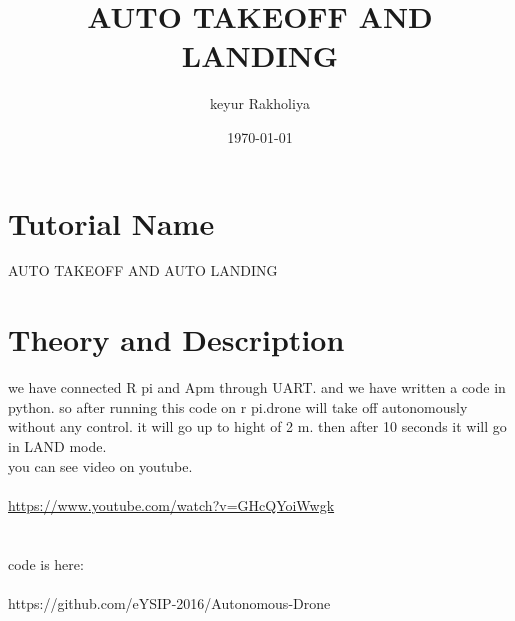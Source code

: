 \documentclass[11pt,a4paper]{article}
\title{AUTO TAKEOFF AND LANDING}
\author{keyur Rakholiya}
\date{\today}
\begin{document}
	\maketitle
	\newpage
	\tableofcontents
	\newpage
	\section{Tutorial Name}
	\hspace{0.5in}AUTO TAKEOFF AND AUTO LANDING
	
	


	


	\section{Theory and Description}
		we have connected R pi and Apm through UART. and we have written a code in python. so after running this code on r pi.drone will take off autonomously without any control. it will go up to hight of 2 m. then after 10 seconds it will go in LAND mode.\\
		you can see video on youtube. \\
		\\
		\url{https://www.youtube.com/watch?v=GHcQYoiWwgk}\\
		\\
		\\
		code is here:\\
		\\
		https://github.com/eYSIP-2016/Autonomous-Drone
		\newline
		

	
\end{document}
